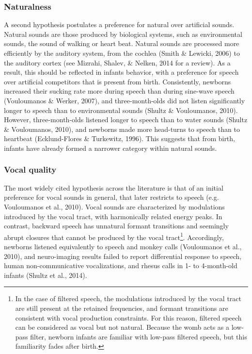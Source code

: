 \documentclass[man]{apa6}
\let\rmarkdownfootnote\footnote%
\def\footnote{\protect\rmarkdownfootnote}
\begin{document}
\subsubsection{Naturalness}\label{naturalness}

A second hypothesis postulates a preference for natural over artificial
sounds. Natural sounds are those produced by biological systems, such as
environmental sounds, the sound of walking or heart beat. Natural sounds
are processed more efficiently by the auditory system, from the cochlea
(Smith \& Lewicki, 2006) to the auditory cortex (see Mizrahi, Shalev, \&
Nelken, 2014 for a review). As a result, this should be reflected in
infants behavior, with a preference for speech over artificial
competitors that is present from birth. Consistently, newborns increased
their sucking rate more during speech than during sine-wave speech
(Vouloumanos \& Werker, 2007), and three-month-olds did not listen
significantly longer to speech than to environmental sounds (Shultz \&
Vouloumanos, 2010). However, three-month-olds listened longer to speech
than to water sounds (Shultz \& Vouloumanos, 2010), and newborns made
more head-turns to speech than to heartbeat (Ecklund-Flores \&
Turkewitz, 1996). This suggests that from birth, infants have already
formed a narrower category within natural sounds.

\subsubsection{Vocal quality}\label{vocal-quality}

The most widely cited hypothesis across the literature is that of an
initial preference for vocal sounds in general, that later restricts to
speech (e.g. Vouloumanos et al., 2010). Vocal sounds are characterized
by modulations introduced by the vocal tract, with harmonically related
energy peaks. In contrast, backward speech has unnatural formant
transitions and seemingly abrupt closures that cannot be produced by the
vocal tract\footnote{In the case of filtered speech, the modulations
  introduced by the vocal tract are still present at the retained
  frequencies, and formant transitions are consistent with vocal
  production constraints. For this reason, filtered speech can be
  considered as vocal but not natural. Because the womb acts as a
  low-pass filter, newborn infants are familiar with low-pass filtered
  speech, but this familiarity fades after birth.}. Accordingly,
newborns listened equivalently to speech and monkey calls (Vouloumanos
et al., 2010), and neuro-imaging results failed to report differential
response to speech, human non-communicative vocalizations, and rhesus
calls in 1- to 4-month-old infants (Shultz et al., 2014).
\end{document}
